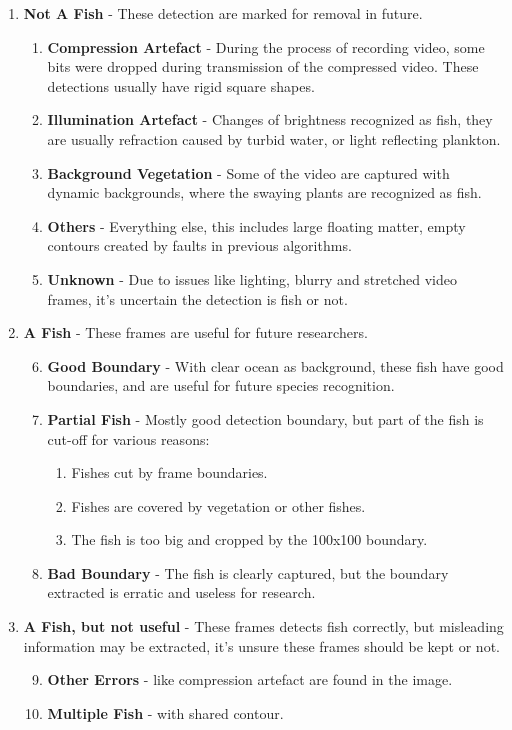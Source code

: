 \documentclass[bsc,logo,twoside,fullspacing,parskip]{infthesis}
\begin{document}
\begin{enumerate}
   \setlength{\parskip}{3pt}

 \item \textbf{Not A Fish} - These detection are marked for removal in future.
 \begin{enumerate}
   \item \textbf{Compression Artefact} - During the process of recording video, some bits were dropped during transmission of the compressed video. These detections usually have rigid square shapes.
   \item \textbf{Illumination Artefact} - Changes of brightness recognized as fish, they are usually refraction caused by turbid water, or light reflecting plankton.
   \item \textbf{Background Vegetation} - Some of the video are captured with dynamic backgrounds, where the swaying plants are recognized as fish.
   \item \textbf{Others} - Everything else, this includes large floating matter, empty contours created by faults in previous algorithms.
   \item \textbf{Unknown} - Due to issues like lighting, blurry and stretched video frames, it's uncertain the detection is fish or not.
 \end{enumerate}
 
 \item \textbf{A Fish} - These frames are useful for future researchers.
 \begin{enumerate}
   \setcounter{enumii}{5} 
   \item \textbf{Good Boundary} - With clear ocean as background, these fish have good boundaries, and are useful for future species recognition.
   \item \textbf{Partial Fish} - Mostly good detection boundary, but part of the fish is cut-off for various reasons:
    \begin{enumerate}
      \item Fishes cut by frame boundaries.
      \item Fishes are covered by vegetation or other fishes.
      \item The fish is too big and cropped by the 100x100 boundary.
    \end{enumerate}
   \item \textbf{Bad Boundary} - The fish is clearly captured, but the boundary extracted is erratic and useless for research. 
 \end{enumerate}
 
 \item \textbf{A Fish, but not useful} - These frames detects fish correctly, but misleading information may be extracted, it's unsure these frames should be kept or not.
 \begin{enumerate}
   \setcounter{enumii}{8} 
   \item \textbf{Other Errors} - like compression artefact are found in the image.
   \item \textbf{Multiple Fish} - with shared contour.
 \end{enumerate}
\end{enumerate}
\end{document}
